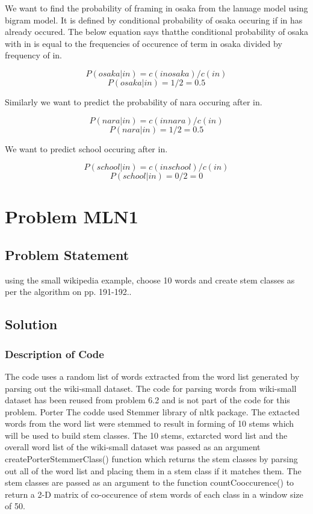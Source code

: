 \documentclass[12pt]{report}
\begin{document}
We want to find the probability of framing in osaka from the lanuage model using bigram model. It is defined by conditional probability of osaka occuring if in has already occured. The below equation says thatthe conditional probability of osaka with in is equal to the frequencies of occurence of  term in osaka divided by frequency of in.

\[P(osaka|in) = c(in osaka)/ c(in)\]
\[P(osaka|in) = 1/2 = 0.5\]

Similarly we want to predict the probability of nara occuring after in.

\[P(nara|in) = c(in nara)/ c(in)\]
\[P(nara|in) = 1/2 = 0.5\]

We want to predict school occuring after in.

\[P(school|in) = c(in school)/ c(in)\]
\[P(school|in) = 0/2 = 0\]

\chapter{Problem MLN1}
\section{Problem Statement}
using the small wikipedia example, choose 10 words and create stem classes as per the algorithm on pp. 191-192..   
\section{Solution}
\subsection{Description of Code}
The code uses a random list of words extracted from the word list generated by parsing out the wiki-small dataset. The code for parsing words from wiki-small dataset has been reused from problem 6.2 and is not part of the code for this problem. Porter The codde used Stemmer library of nltk package. The extacted words from the word list were stemmed to result in forming of 10 stems which will be used to build stem classes. The 10 stems, extarcted word list and the overall word list of the wiki-small dataset was passed as an argument createPorterStemmerClass() function which returns the stem classes by parsing out all of the word list and placing them in a stem class if it matches them. The stem classes are passed as an argument to the function countCooccurence() to return a 2-D matrix of co-occurence of stem words of each class in a window size of 50.     


\end{document}
